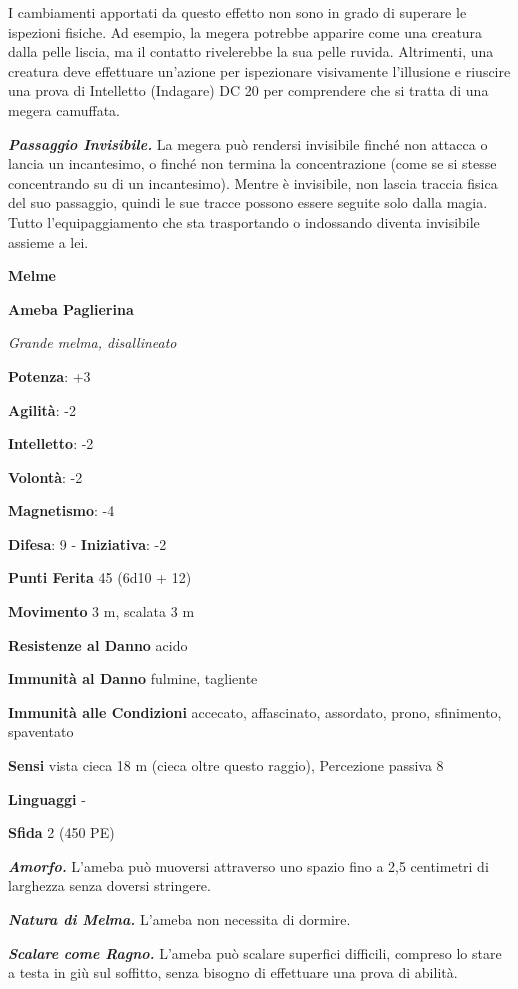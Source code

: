 \begin{multicols}{2}
I cambiamenti apportati da questo effetto non sono in grado di superare
le ispezioni fisiche. Ad esempio, la megera potrebbe apparire come una
creatura dalla pelle liscia, ma il contatto rivelerebbe la sua pelle
ruvida. Altrimenti, una creatura deve effettuare un'azione per
ispezionare visivamente l'illusione e riuscire una prova di Intelletto
(Indagare) DC 20 per comprendere che si tratta di una megera camuffata.

\emph{\textbf{Passaggio Invisibile.}} La megera può rendersi invisibile
finché non attacca o lancia un incantesimo, o finché non termina la
concentrazione (come se si stesse concentrando su di un incantesimo).
Mentre è invisibile, non lascia traccia fisica del suo passaggio, quindi
le sue tracce possono essere seguite solo dalla magia. Tutto
l'equipaggiamento che sta trasportando o indossando diventa invisibile
assieme a lei.

\textbf{Melme}

\textbf{Ameba Paglierina}

\emph{Grande melma, disallineato}

\textbf{Potenza}: +3

\textbf{Agilità}: -2

\textbf{Intelletto}: -2

\textbf{Volontà}: -2

\textbf{Magnetismo}: -4

\textbf{Difesa}: 9 - \textbf{Iniziativa}: -2

\textbf{Punti Ferita} 45 (6d10 + 12)

\textbf{Movimento} 3 m, scalata 3 m

\textbf{Resistenze al Danno} acido

\textbf{Immunità al Danno} fulmine, tagliente

\textbf{Immunità alle Condizioni} accecato, affascinato, assordato,
prono, sfinimento, spaventato

\textbf{Sensi} vista cieca 18 m (cieca oltre questo raggio), Percezione
passiva 8

\textbf{Linguaggi} -

\textbf{Sfida} 2 (450 PE)

\emph{\textbf{Amorfo.}} L'ameba può muoversi attraverso uno spazio fino
a 2,5 centimetri di larghezza senza doversi stringere.

\emph{\textbf{Natura di Melma.}} L'ameba non necessita di dormire.

\emph{\textbf{Scalare come Ragno.}} L'ameba può scalare superfici
difficili, compreso lo stare a testa in giù sul soffitto, senza bisogno
di effettuare una prova di abilità.


\end{multicols}
